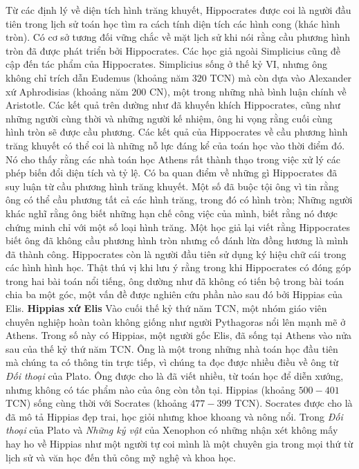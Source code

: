 \begin{multicols}{2}
	\vskip 0.05cm
	Từ các định lý về diện tích hình trăng khuyết, Hippocrates được coi là người đầu tiên trong lịch sử toán học tìm ra cách tính diện tích các hình cong (khác hình tròn). 
	\vskip 0.05cm
	Có cơ sở tương đối vững chắc về mặt lịch sử  khi nói rằng cầu phương hình tròn đã được phát triển bởi Hippocrates. Các học giả ngoài Simplicius cũng đề cập đến tác phẩm của Hippocrates. Simplicius sống ở thế kỷ VI, nhưng ông không chỉ trích dẫn Eudemus (khoảng năm $320$ TCN) mà còn dựa vào Alexander xứ Aphrodisias (khoảng năm $200$ CN), một trong những nhà bình luận chính về Aristotle. 
	Các kết quả trên dường như đã khuyến khích Hippocrates, cũng như những người cùng thời và những người kế nhiệm, ông hi vọng rằng cuối cùng hình tròn sẽ được cầu phương.
	\vskip 0.05cm
	Các kết quả của Hippocrates về cầu phương hình trăng khuyết có thể coi là những nỗ lực đáng kể của toán học vào thời điểm đó. Nó cho thấy rằng các nhà toán học Athens rất thành thạo trong việc xử lý các phép biến đổi diện tích và tỷ lệ.
	\vskip 0.05cm 
	Có ba quan điểm về những gì Hippocrates đã suy luận từ cầu phương hình trăng khuyết. Một số đã buộc tội ông vì tin rằng ông có thể cầu phương tất cả các hình trăng, trong đó có hình tròn; Những người khác nghĩ rằng ông biết những hạn chế công việc của mình, biết rằng nó được chứng minh chỉ với một số loại hình trăng. Một học giả lại viết rằng Hippocrates biết ông đã không cầu phương hình tròn nhưng cố đánh lừa đồng hương là mình đã thành công. 
	\vskip 0.05cm
	Hippocrates còn là người đầu tiên sử dụng ký hiệu chữ cái trong các hình hình học. Thật thú vị khi lưu ý rằng trong khi Hippocrates có đóng góp trong hai bài toán nổi tiếng, ông dường như đã không có tiến bộ trong bài toán chia ba một góc, một vấn đề được nghiên cứu phần nào sau đó bởi Hippias của Elis.
	\vskip 0.05cm
	\textbf{\color{lichsutoanhoc}Hippias xứ Elis}
	\vskip 0.05cm
	Vào cuối thế kỷ thứ năm TCN, một nhóm giáo viên chuyên nghiệp hoàn toàn không giống như người Pythagoras nổi lên mạnh mẽ ở Athens. Trong số này có Hippias, một người gốc Elis, đã sống tại Athens vào nửa sau của thế kỷ thứ năm TCN.  Ông là một trong những nhà toán học đầu tiên mà chúng ta có thông tin trực tiếp, vì chúng ta đọc được nhiều điều về ông từ \textit{Đối thoại} của Plato. Ông được cho là đã viết nhiều, từ toán học để diễn xướng, nhưng không có tác phẩm nào của ông còn tồn tại.  
	\vskip 0.05cm
	Hippias (khoảng $500-401$ TCN)  sống cùng thời với Socrates (khoảng $477-399$ TCN). Socrates được cho là đã mô tả Hippias đẹp trai, học giỏi nhưng khoe khoang và nông nổi. Trong \textit{Đối thoại} của Plato và \textit{Những kỷ vật} của Xenophon có những nhận xét không mấy hay ho về Hippias như một người tự coi mình là một chuyên gia trong mọi thứ từ lịch sử và văn học đến thủ công mỹ nghệ và khoa học. 

\end{multicols}
